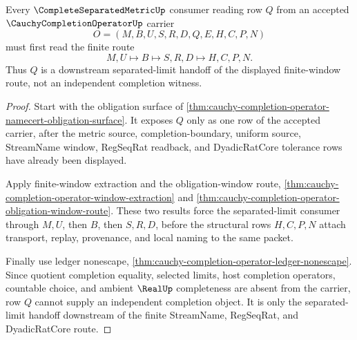 \begin{theorem}
\label{thm:cauchy-completion-operator-separated-limit-factorization}
Every $\CompleteSeparatedMetricUp$ consumer reading row $Q$ from an accepted $\CauchyCompletionOperatorUp$ carrier
$$
O=(M,B,U,S,R,D,Q,E,H,C,P,N)
$$
must first read the finite route
$$
M,U \longmapsto B \longmapsto S,R,D \longmapsto H,C,P,N .
$$
Thus $Q$ is a downstream separated-limit handoff of the displayed finite-window route, not an independent completion witness.
\end{theorem}
\begin{proof}
Start with the obligation surface of \autoref{thm:cauchy-completion-operator-namecert-obligation-surface}. It exposes $Q$ only as one row of the accepted carrier, after the metric source, completion-boundary, uniform source, StreamName window, RegSeqRat readback, and DyadicRatCore tolerance rows have already been displayed.

Apply finite-window extraction and the obligation-window route, \autoref{thm:cauchy-completion-operator-window-extraction} and \autoref{thm:cauchy-completion-operator-obligation-window-route}. These two results force the separated-limit consumer through $M,U$, then $B$, then $S,R,D$, before the structural rows $H,C,P,N$ attach transport, replay, provenance, and local naming to the same packet.

Finally use ledger nonescape, \autoref{thm:cauchy-completion-operator-ledger-nonescape}. Since quotient completion equality, selected limits, host completion operators, countable choice, and ambient $\RealUp$ completeness are absent from the carrier, row $Q$ cannot supply an independent completion object. It is only the separated-limit handoff downstream of the finite StreamName, RegSeqRat, and DyadicRatCore route.
\end{proof}


